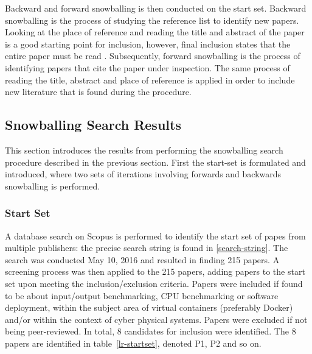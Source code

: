 Backward and forward snowballing is then conducted on the start set. Backward snowballing is the process of studying the reference list to identify new papers. Looking at the place of reference and reading the title and abstract of the paper is a good starting point for inclusion, however, final inclusion states that the entire paper must be read \cite{Wohlin}. Subsequently, forward snowballing is the process of identifying papers that cite the paper under inspection. The same process of reading the title, abstract and place of reference is applied in order to include new literature that is found during the procedure. 



\subsection{Snowballing Search Results}
This section introduces the results from performing the snowballing search procedure described in the previous section. First the start-set is formulated and introduced, where two sets of iterations involving forwards and backwards snowballing is performed. 

\subsubsection*{Start Set}
A database search on Scopus \cite{scopus} is performed to identify the start set of papes from multiple publishers: the precise search string is found in \ref{search-string}. The search was conducted May 10, 2016 and resulted in finding 215 papers. A screening process was then applied to the 215 papers, adding papers to the start set upon meeting the inclusion/exclusion criteria. Papers were included if found to be about input/output benchmarking, CPU benchmarking or software deployment, within the subject area of virtual containers (preferably Docker) and/or within the context of cyber physical systems. Papers were excluded if not being peer-reviewed. In total, 8 candidates for inclusion were identified. The 8 papers are identified in table~\ref{lr-startset}, denoted P1, P2 and so on.

